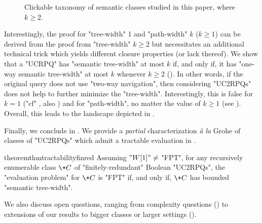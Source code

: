 \begin{figure}
{
	}
	\caption{
		\AP\label{fig:taxonomy-semantic}
		Clickable taxonomy of semantic classes studied in this paper, where $k \geq 2$.
	}
\end{figure}
Interestingly, the proof for "tree-width" 1 and "path-width" $k$ ($k \geq 1$)
can be derived from the proof from "tree-width" $k\geq 2$ but necessitates an
additional technical trick which yields different closure properties (or lack thereof).
We show that a "UCRPQ" has "semantic tree-width" at most $k$ if, and only if, it
has "one-way semantic tree-width" at most $k$ whenever $k \geq 2$
(). In other words, if the original query does not
use "two-way navigation", then considering "UC2RPQs" does not help to further minimize the "tree-width". Interestingly, this is false for $k=1$ ("cf" ,
also \cite[Proposition 6.4]{BarceloRomeroVardi2016SemanticAcyclicity}) and for "path-width", no matter the value of $k\geq 1$ (see ). Overall, this leads to
the landscape depicted in .

Finally, we conclude in .
We provide a \emph{partial} characterization \emph{à la} Grohe of classes of "UC2RPQs" which admit a tractable evaluation in .
\begin{restatable*}{theorem}{thmtractabilityfinred}
    \AP\label{thm:tractability-finred}
    Assuming $"W[1]" \neq $ "FPT", for any recursively enumerable class $\+C$ of "finitely-redundant" Boolean "UC2RPQs", the "evaluation problem" for $\+C$ is "FPT" if, and only if, $\+C$ has bounded "semantic tree-width".
\end{restatable*}
We also discuss open questions, ranging from complexity
questions () to extensions of our results to bigger classes
or larger settings ().

